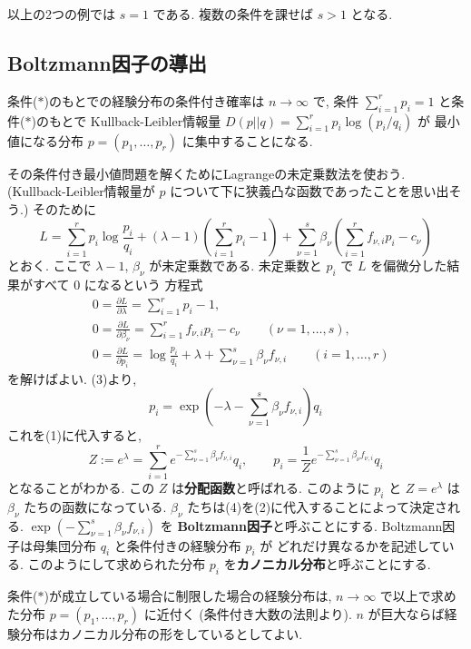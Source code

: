 \documentclass[12pt,twoside]{jarticle}
\renewcommand\d{\partial}
\theoremstyle{definition} %
\theoremstyle{definition} %
\theoremstyle{definition} %
\numberwithin{theorem}{section}
\numberwithin{equation}{section}
\numberwithin{figure}{section}
\numberwithin{table}{section}
\begin{document}
以上の2つの例では $s=1$ である.  複数の条件を課せば $s>1$ となる.


\subsection{Boltzmann因子の導出}

条件($*$)のもとでの経験分布の条件付き確率は $n\to\infty$ で, 
条件 $\sum_{i=1}^r p_i=1$ と条件($*$)のもとで
Kullback-Leibler情報量 $D(p||q)=\sum_{i=1}^r p_i\log(p_i/q_i)$ が
最小値になる分布 $p=(p_1,\ldots,p_r)$ に集中することになる.

その条件付き最小値問題を解くためにLagrangeの未定乗数法を使おう.
(Kullback-Leibler情報量が $p$ について下に狭義凸な函数であったことを思い出そう.)
そのために
\[
L 
= \sum_{i=1}^r p_i \log\frac{p_i}{q_i} 
+ (\lambda-1)\left(\sum_{i=1}^r p_i-1\right)
+ \sum_{\nu=1}^s\beta_\nu\left(\sum_{i=1}^r f_{\nu,i}p_i - c_\nu \right)
\]
とおく. ここで $\lambda-1$, $\beta_\nu$ が未定乗数である.
未定乗数と $p_i$ で $L$ を偏微分した結果がすべて $0$ になるという
方程式
\begin{align*}
&
0=\frac{\d L}{\d\lambda} = \sum_{i=1}^r p_i - 1,
\tag{1}
\\ &
0=\frac{\d L}{\d\beta_\nu} = \sum_{i=1}^r f_{\nu,i}p_i - c_\nu
\qquad (\nu=1,\ldots,s),
\tag{2}
\\ &
0=\frac{\d L}{\d p_i} = \log\frac{p_i}{q_i} + \lambda + \sum_{\nu=1}^s \beta_\nu f_{\nu,i}
\qquad (i=1,\ldots,r)
\tag{3} 
\end{align*}
を解けばよい. (3)より,
\[
p_i = \exp\left(-\lambda-\sum_{\nu=1}^s \beta_\nu f_{\nu,i} \right)q_i
\]
これを(1)に代入すると,
\[
Z:= e^\lambda 
= \sum_{i=1}^r e^{-\sum_{\nu=1}^s \beta_\nu f_{\nu,i}}q_i,
\qquad
p_i = \frac{1}{Z}e^{-\sum_{\nu=1}^s \beta_\nu f_{\nu,i}}q_i
\tag{4}
\]
となることがわかる. この $Z$ は{\bf 分配函数}と呼ばれる.
このように $p_i$ と $Z=e^\lambda$ は $\beta_\nu$ たちの函数になっている. 
$\beta_\nu$ たちは(4)を(2)に代入することによって決定される.
$\exp\left(-\sum_{\nu=1}^s \beta_\nu f_{\nu,i}\right)$ を
{\bf Boltzmann因子}と呼ぶことにする.
Boltzmann因子は母集団分布 $q_i$ と条件付きの経験分布 $p_i$ が
どれだけ異なるかを記述している.
このようにして求められた分布 $p_i$ を{\bf カノニカル分布}と呼ぶことにする.

条件($*$)が成立している場合に制限した場合の経験分布は,
$n\to\infty$ で以上で求めた分布 $p=(p_1,\ldots,p_r)$ に近付く
(条件付き大数の法則より). 
$n$ が巨大ならば経験分布はカノニカル分布の形をしているとしてよい.
\end{document}
